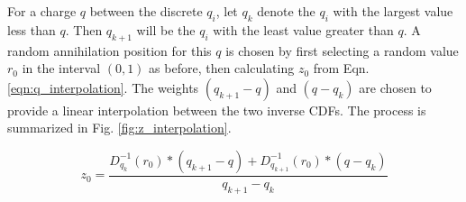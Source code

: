 \documentclass[superscriptaddress,aps,prb,11pt]{revtex4-1}
\begin{document}
For a charge $q$ between the discrete $q_i$, let $q_k$ denote the $q_i$ with the largest value less than $q$.  Then $q_{k+1}$ will be the $q_i$ with the least value greater than $q$.  A random annihilation position for this $q$ is chosen by first selecting a random value $r_0$ in the interval $(0,1)$ as before, then calculating $z_0$ from Eqn. \ref{eqn:q_interpolation}.  The weights $(q_{k+1}-q)$ and $(q-q_k)$ are chosen to provide a linear interpolation between the two inverse CDFs.  The process is summarized in Fig. \ref{fig:z_interpolation}.

\begin{equation}
z_0=\frac{D^{-1}_{q_k}(r_0)*(q_{k+1}-q) +
 D^{-1}_{q_{k+1}}(r_0)*(q-q_k)}{q_{k+1}-q_k}
\label{eqn:q_interpolation}
\end{equation}

\begin{figure}
  \centering

\end{figure}
\end{document}
